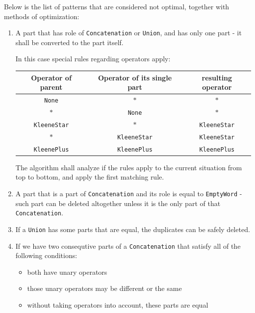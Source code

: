 \documentclass{article}
\begin{document}
Below is the list of patterns that are considered not optimal, together with methods of optimization:
\begin{enumerate}

  \item A part that has role of \verb|Concatenation| or \verb|Union|, and has only one part - it
  shall be converted to the part itself.

  In this case special rules regarding operators apply:

  \noindent
  \begin{tabular}{c|c|c}
  Operator of parent & Operator of its single part & resulting operator \\ \hline
  \verb|None| & $*$ & $*$ \\
  $*$ & \verb|None| & $*$ \\
  \verb|KleeneStar| & $*$ & \verb|KleeneStar| \\
  $*$ & \verb|KleeneStar| & \verb|KleeneStar| \\
  \verb|KleenePlus| & \verb|KleenePlus| & \verb|KleenePlus| \\
  \end{tabular}

  \vspace{10pt} The algorithm shall analyze if the rules apply to the current situation from top to
  bottom, and apply the first matching rule.

  \item A part that is a part of \verb|Concatenation| and its role is equal to \verb|EmptyWord| -
  such part can be deleted altogether unless it is the only part of that \verb|Concatenation|.

  \item If a \verb|Union| has some parts that are equal, the duplicates can be safely deleted.

  \item If we have two consequtive parts of a \verb|Concatenation| that satisfy all of the following conditions:

  \begin{itemize}

    \item both have unary operators

    \item those unary operators may be different or the same

    \item without taking operators into account, these parts are equal


\end{itemize}
\end{enumerate}
\end{document}
